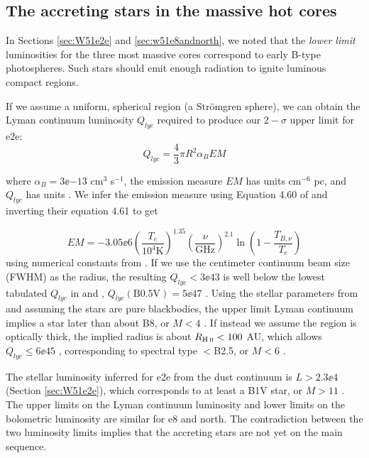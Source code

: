 \documentclass{emulateapj}
\begin{document}
\subsection{The accreting stars in the massive hot cores}
\label{sec:stellarproperties}
In Sections \ref{sec:W51e2e} and \ref{sec:w51e8andnorth}, we noted that the
\emph{lower limit} luminosities for the three most massive cores correspond to
early B-type photospheres.  Such stars should emit enough radiation to ignite
luminous compact \hii regions. %

If we assume a uniform, spherical \hii region (a Strömgren sphere), we can
obtain the Lyman continuum luminosity $Q_{lyc}$ required to produce our
$2-\sigma$ upper limit for e2e:
\begin{equation}
    Q_{lyc} = \frac{4}{3} \pi R^2 \alpha_B EM
\end{equation}

where $\alpha_B = 3\ee{-13}$ cm$^{3}$ s$^{-1}$, the emission measure $EM$ has
units cm$^{-6}$ pc, and $Q_{lyc}$ has units \pers.  We infer the emission measure
using Equation 4.60 of \citet{Condon2007a} and inverting their equation 4.61 to
get

\begin{equation}
EM = -3.05\ee{6} 
\left(\frac{T_e}{10^4\mathrm{K}}\right)^{1.35}
\left(\frac{\nu}{\mathrm{GHz}}\right)^{2.1}
\ln\left(1-\frac{T_{B,\nu}}{T_e}\right)
\end{equation}
using numerical constants
from \citet{Mezger1967a}.  If we use the centimeter
continuum beam size (FWHM) as the radius, the resulting $Q_{lyc}<3\ee{43}$ \pers 
is well below the lowest tabulated $Q_{lyc}$ in \citet{Vacca1996a} and
\citet{Sternberg2003a},
$Q_{lyc}(\mathrm{B0.5V}) = 5\ee{47}$ \pers.  Using the stellar parameters from
\citet{Pecaut2013a} and assuming the stars are pure blackbodies, the upper
limit Lyman continuum implies a star later than about B8, or $M<4$ \msun.  If
instead we assume the \hii region is optically thick, the implied radius is
about $R_{\scriptsize{\hii}}<100$ AU, which allows $Q_{lyc}\leq6\ee{45}$ \pers,
corresponding to spectral type $<$B2.5, or $M<6$ \msun.  


The stellar luminosity inferred for e2e from the dust continuum is
$L>2.3\ee{4}$ \lsun (Section \ref{sec:W51e2e}), which corresponds to at least a
B1V star, or $M>11$ \msun.  The upper limits on the Lyman continuum luminosity
and lower limits on the bolometric luminosity are similar for e8 and north.
The contradiction between the two luminosity limits implies that the accreting
stars are not yet on the main sequence.
\end{document}
